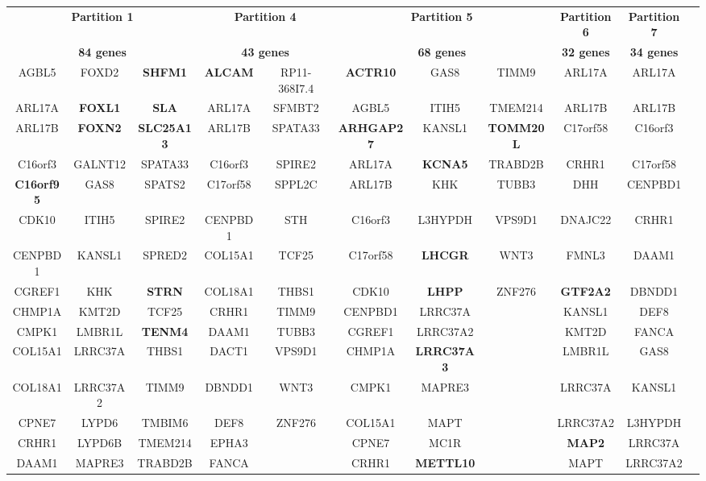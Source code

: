 \begin{adjustwidth}{-3 cm}{-3 cm}\centering\begin{threeparttable}[H]
	\tiny
	\begin{tabular}{ccc||cc||ccc||c||cc}\toprule
		\multicolumn{3}{c}{\textbf{Partition 1}} &\multicolumn{2}{c}{\textbf{Partition 4}} &\multicolumn{3}{c}{\textbf{Partition 5}} &\textbf{Partition 6} &\textbf{Partition 7} \\
		\multicolumn{3}{c}{\textbf{84 genes}} &\multicolumn{2}{c}{\textbf{43 genes}} &\multicolumn{3}{c}{\textbf{68 genes}} &\textbf{32 genes} &\textbf{34 genes}
		\\\midrule
		AGBL5 &FOXD2 &\textbf{SHFM1} &\textbf{ALCAM} &RP11-368I7.4 &\textbf{ACTR10} &GAS8 &TIMM9 &ARL17A &ARL17A \\
		ARL17A &\textbf{FOXL1} &\textbf{SLA} &ARL17A &SFMBT2 &AGBL5 &ITIH5 &TMEM214 &ARL17B &ARL17B \\
		ARL17B &\textbf{FOXN2} &\textbf{SLC25A13} &ARL17B &SPATA33 &\textbf{ARHGAP27} &KANSL1 &\textbf{TOMM20L} &C17orf58 &C16orf3 \\
		C16orf3 &GALNT12 &SPATA33 &C16orf3 &SPIRE2 &ARL17A &\textbf{KCNA5} &TRABD2B &CRHR1 &C17orf58 \\
		\textbf{C16orf95} &GAS8 &SPATS2 &C17orf58 &SPPL2C &ARL17B &KHK &TUBB3 &DHH &CENPBD1 \\
		CDK10 &ITIH5 &SPIRE2 &CENPBD1 &STH &C16orf3 &L3HYPDH &VPS9D1 &DNAJC22 &CRHR1 \\
		CENPBD1 &KANSL1 &SPRED2 &COL15A1 &TCF25 &C17orf58 &\textbf{LHCGR} &WNT3 &FMNL3 &DAAM1 \\
		CGREF1 &KHK &\textbf{STRN} &COL18A1 &THBS1 &CDK10 &\textbf{LHPP} &ZNF276 &\textbf{GTF2A2} &DBNDD1 \\
		CHMP1A &KMT2D &TCF25 &CRHR1 &TIMM9 &CENPBD1 &LRRC37A & &KANSL1 &DEF8 \\
		CMPK1 &LMBR1L &\textbf{TENM4} &DAAM1 &TUBB3 &CGREF1 &LRRC37A2 & &KMT2D &FANCA \\
		COL15A1 &LRRC37A &THBS1 &DACT1 &VPS9D1 &CHMP1A &\textbf{LRRC37A3} &\textbf{} &LMBR1L &GAS8 \\
		COL18A1 &LRRC37A2 &TIMM9 &DBNDD1 &WNT3 &CMPK1 &MAPRE3 & &LRRC37A &KANSL1 \\
		CPNE7 &LYPD6 &TMBIM6 &DEF8 &ZNF276 &COL15A1 &MAPT & &LRRC37A2 &L3HYPDH \\
		CRHR1 &LYPD6B &TMEM214 &EPHA3 & &CPNE7 &MC1R & &\textbf{MAP2} &LRRC37A \\
		DAAM1 &MAPRE3 &TRABD2B &FANCA & &CRHR1 &\textbf{METTL10} &\textbf{} &MAPT &LRRC37A2 \\

\end{tabular}
\end{threeparttable}
\end{adjustwidth}
